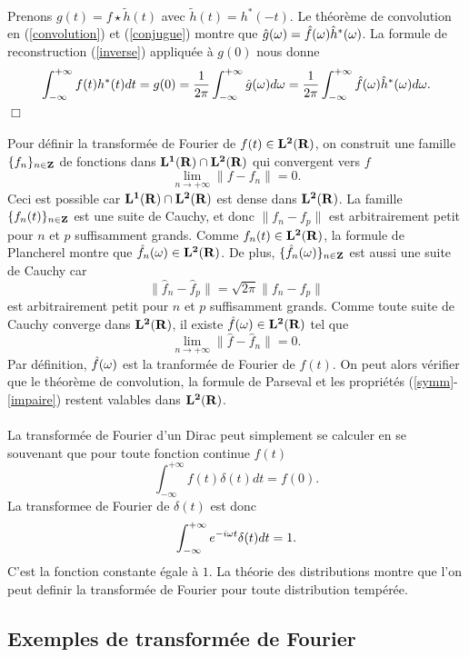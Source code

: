 \\
Prenons $g(t) = f \star \tilde h (t)$ avec 
$\tilde h (t) = h^*(-t)$. 
Le th\'eor\`eme de convolution en (\ref{convolution}) et 
(\ref{conjugue}) montre que
$\hat g ({\omega}) = \hat f({\omega}) \hat h^*({\omega})$. 
La formule de reconstruction (\ref{inverse}) appliqu\'ee
\`a $g(0)$ nous donne
\begin{equation}
\int_{- \infty}^ {+ \infty} f(t) h^* (t) dt = 
g(0) = 
\frac 1 {2 \pi} \int_{-\infty}^{+ \infty} \hat g ({\omega}) d {\omega} =
\frac 1 {2 \pi} 
\int_{- \infty}^{+ \infty} \hat f( {\omega} ) \hat h ^*({\omega}) d{\omega} . 
\end{equation}
$\Box$
\\
\\
Pour d\'efinir la transform\'ee de Fourier de
$f(t) \in {\bf L ^ 2 ({\bf{R}})}$, on construit
une famille $\{f_n\}_{ n \in {{\bf{Z}}}}$ de fonctions dans 
${\bf L ^ 1 ({\bf{R}})} \cap {\bf L ^ 2 ({\bf{R}})}$ qui convergent vers $f$
\[
\lim_{n \rightarrow + \infty} \|f - f_n \| = 0.
\]
Ceci est possible car
${\bf L ^ 1 ({\bf{R}})} \cap {\bf L ^ 2 ({\bf{R}})}$ est dense dans ${\bf L ^ 2 ({\bf{R}})}$.
La famille $\{f_n (t)\}_{ n \in {{\bf{Z}}}}$ est une suite de Cauchy, 
et donc
$\| f_n - f_p \|$ est arbitrairement petit
pour $n$ et $p$ suffisamment grands.
Comme $f_n (t) \in {\bf L ^ 2 ({\bf{R}})}$, la formule de Plancherel montre que
$\hat f_n ({\omega}) \in {\bf L ^ 2 ({\bf{R}})}$.
De plus, $\{\hat f_n ({\omega})\}_{ n \in {{\bf{Z}}}}$ est aussi une suite de Cauchy car
\[
\| \hat f_n - \hat f_p \| = \sqrt{2 \pi}  \| f_n - f_p \| 
\]
est arbitrairement petit pour $n$ et $p$ suffisamment grands.
Comme toute suite de Cauchy converge dans
${\bf L ^ 2 ({\bf{R}})}$, il existe $\hat f({\omega}) \in {\bf L ^ 2 ({\bf{R}})}$ tel que
\[
\lim_{n \rightarrow + \infty} \|\hat f - \hat f_n \| = 0.
\]
Par d\'efinition, $\hat f({\omega})$ est la tranform\'ee de
Fourier de $f(t)$.
On peut alors v\'erifier que 
le th\'eor\`eme de convolution, la formule
de Parseval et les propri\'et\'es
(\ref{symm}-\ref{impaire}) restent valables dans ${\bf L ^ 2 ({\bf{R}})}$.
\\
\\
La transform\'ee de Fourier d'un Dirac peut simplement se
calculer en se souvenant que pour toute fonction continue
$f(t)$
\[
\int^{+\infty}_{-\infty} f (t) \delta (t) dt = f(0).
\]
La transformee de Fourier de $\delta (t)$ est donc
\[
\int^{+\infty}_{-\infty} e^{-i{\omega} t} \delta (t) dt  = 1 .
\]
C'est la fonction constante \'egale \`a $1$.
La th\'eorie des distributions \cite{bony2} montre que l'on
peut definir la transform\'ee de Fourier pour toute distribution
temp\'er\'ee.

\subsection{Exemples de transform\'ee de Fourier}

